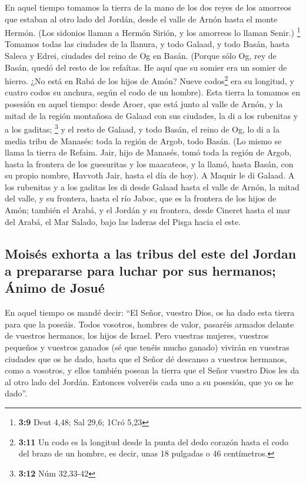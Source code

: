  En aquel tiempo tomamos la tierra de la mano de los dos
reyes de los amorreos que estaban al otro lado del Jordán, desde el
valle de Arnón hasta el monte Hermón.  (Los sidonios
llaman a Hermón Sirión, y los amorreos lo llaman Senir.) \footnote{\textbf{3:9}
  Deut 4,48; Sal 29,6; 1Cró 5,23}  Tomamos todas las
ciudades de la llanura, y todo Galaad, y todo Basán, hasta Saleca y
Edrei, ciudades del reino de Og en Basán.  (Porque sólo
Og, rey de Basán, quedó del resto de los refaítas. He aquí que su somier
era un somier de hierro. ¿No está en Rabá de los hijos de Amón? Nueve
codos\footnote{\textbf{3:11} Un codo es la longitud desde la punta del
  dedo corazón hasta el codo del brazo de un hombre, es decir, unas 18
  pulgadas o 46 centímetros.} era su longitud, y cuatro codos su
anchura, según el codo de un hombre).  Esta tierra la
tomamos en posesión en aquel tiempo: desde Aroer, que está junto al
valle de Arnón, y la mitad de la región montañosa de Galaad con sus
ciudades, la di a los rubenitas y a los gaditas; \footnote{\textbf{3:12}
  Núm 32,33-42}  y el resto de Galaad, y todo Basán, el
reino de Og, lo di a la media tribu de Manasés: toda la región de Argob,
todo Basán. (Lo mismo se llama la tierra de Refaim. 
Jair, hijo de Manasés, tomó toda la región de Argob, hasta la frontera
de los guesuritas y los maacateos, y la llamó, hasta Basán, con su
propio nombre, Havvoth Jair, hasta el día de hoy).  A
Maquir le di Galaad.  A los rubenitas y a los gaditas les
di desde Galaad hasta el valle de Arnón, la mitad del valle, y su
frontera, hasta el río Jaboc, que es la frontera de los hijos de Amón;
 también el Arabá, y el Jordán y su frontera, desde
Cineret hasta el mar del Arabá, el Mar Salado, bajo las laderas del
Pisga hacia el este.

\hypertarget{moisuxe9s-exhorta-a-las-tribus-del-este-del-jordan-a-prepararse-para-luchar-por-sus-hermanos-uxe1nimo-de-josuuxe9}{%
\subsection{Moisés exhorta a las tribus del este del Jordan a prepararse
para luchar por sus hermanos; Ánimo de
Josué}\label{moisuxe9s-exhorta-a-las-tribus-del-este-del-jordan-a-prepararse-para-luchar-por-sus-hermanos-uxe1nimo-de-josuuxe9}}

 En aquel tiempo os mandé decir: ``El Señor, vuestro
Dios, os ha dado esta tierra para que la poseáis. Todos vosotros,
hombres de valor, pasaréis armados delante de vuestros hermanos, los
hijos de Israel.  Pero vuestras mujeres, vuestros
pequeños y vuestros ganados (sé que tenéis mucho ganado) vivirán en
vuestras ciudades que os he dado,  hasta que el Señor dé
descanso a vuestros hermanos, como a vosotros, y ellos también posean la
tierra que el Señor vuestro Dios les da al otro lado del Jordán.
Entonces volveréis cada uno a su posesión, que yo os he dado''.

